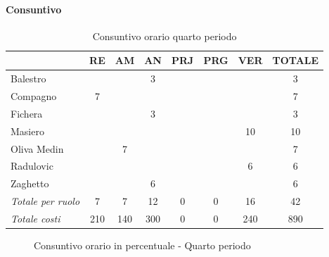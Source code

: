 \documentclass[a4paper,12pt]{article}
\begin{document}
            \paragraph{Consuntivo}
                \begin{table}[H]
                \centering
                \caption{Consuntivo orario quarto periodo}
                \begin{tabular}{|l|c|c|c|c|c|c|c|}
                \hline
                    \rowcolor{lightgray}{\textbf{Membro}} & {\textbf{RE}} & {\textbf{AM}} & {\textbf{AN}} & {\textbf{PRJ}} & {\textbf{PRG}} & {\textbf{VER}} & {\textbf{TOTALE}}\\
                \hline
                    Balestro & & & 3 & & & & 3\\
                \hline
                    Compagno & 7 & & & & & & 7\\
                \hline
                    Fichera & & & 3 & & & & 3\\
                \hline
                    Masiero & & & & & & 10 & 10\\
                \hline
                    Oliva Medin & & 7 & & & & & 7\\
                \hline
                    Radulovic & & & & & & 6 & 6\\
                \hline
                    Zaghetto & & & 6 & & & & 6\\
                \hline
                    \rowcolor{lightgray}\textit{Totale per ruolo} & 7 & 7 & 12 & 0 & 0 & 16 & 42\\
                \hline
                    \rowcolor{lightgray}\textit{Totale costi} & 210 & 140 & 300 & 0 & 0 & 240 & 890\\
                \hline
                \end{tabular}
                \end{table}

                \begin{figure}[H]
                \centering
                \caption{Consuntivo orario in percentuale - Quarto periodo}
                \end{figure}
                
\end{document}
